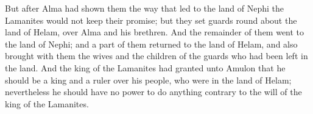 But after Alma had shown them the way that led to the land of Nephi the Lamanites would not keep their promise; but they set guards round about the land of Helam, over Alma and his brethren.
\bverse \iffalse And the remainder of them went to the land of Nephi; and a part of them returned to the land of Helam, and also brought with them the wives and the children of the guards who had been left in the land. \fi
And the remainder of them went to the land of Nephi; and a part of them returned to the land of Helam, and also brought with them the wives and the children of the guards who had been left in the land.
\bverse \iffalse And the king of the Lamanites had granted unto Amulon that he should be a king and a ruler over his people, who were in the land of Helam; nevertheless he should have no power to do anything contrary to the will of the king of the Lamanites. \fi
And the king of the Lamanites had granted unto Amulon that he should be a king and a ruler over his people, who were in the land of Helam; nevertheless he should have no power to do anything contrary to the will of the king of the Lamanites.

